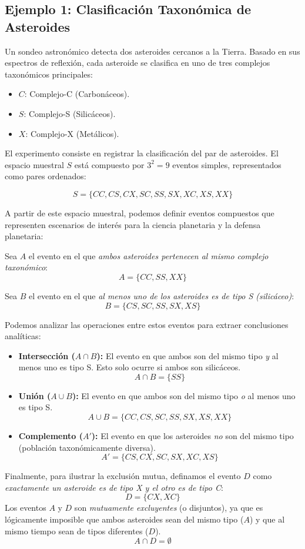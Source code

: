 \subsection{Ejemplo 1: Clasificación Taxonómica de Asteroides}

Un sondeo astronómico detecta dos asteroides cercanos a la Tierra. Basado en sus espectros de reflexión, cada asteroide se clasifica en uno de tres complejos taxonómicos principales:
\begin{itemize}
    \item $C$: Complejo-C (Carbonáceos).
    \item $S$: Complejo-S (Silicáceos).
    \item $X$: Complejo-X (Metálicos).
\end{itemize}

El experimento consiste en registrar la clasificación del par de asteroides. El espacio muestral $S$ está compuesto por $3^2 = 9$ eventos simples, representados como pares ordenados:


$$ S = \{CC, CS, CX, SC, SS, SX, XC, XS, XX\} $$

A partir de este espacio muestral, podemos definir eventos compuestos que representen escenarios de interés para la ciencia planetaria y la defensa planetaria:

Sea $A$ el evento en el que \textit{ambos asteroides pertenecen al mismo complejo taxonómico}:
$$ A = \{CC, SS, XX\} $$

Sea $B$ el evento en el que \textit{al menos uno de los asteroides es de tipo S (silicáceo)}:
$$ B = \{CS, SC, SS, SX, XS\} $$

Podemos analizar las operaciones entre estos eventos para extraer conclusiones analíticas:
\begin{itemize}
    \item \textbf{Intersección ($A \cap B$):} El evento en que ambos son del mismo tipo \textit{y} al menos uno es tipo S. Esto solo ocurre si ambos son silicáceos.
    $$ A \cap B = \{SS\} $$
    \item \textbf{Unión ($A \cup B$):} El evento en que ambos son del mismo tipo \textit{o} al menos uno es tipo S.
    $$ A \cup B = \{CC, CS, SC, SS, SX, XS, XX\} $$
    \item \textbf{Complemento ($A'$):} El evento en que los asteroides \textit{no} son del mismo tipo (población taxonómicamente diversa).
    $$ A' = \{CS, CX, SC, SX, XC, XS\} $$
\end{itemize}

Finalmente, para ilustrar la exclusión mutua, definamos el evento $D$ como \textit{exactamente un asteroide es de tipo X y el otro es de tipo C}:
$$ D = \{CX, XC\} $$
Los eventos $A$ y $D$ son \textit{mutuamente excluyentes} (o disjuntos), ya que es lógicamente imposible que ambos asteroides sean del mismo tipo ($A$) y que al mismo tiempo sean de tipos diferentes ($D$). $$A \cap D = \emptyset$$

